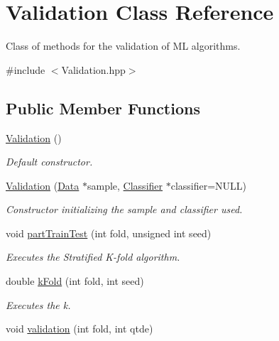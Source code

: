 \hypertarget{class_validation}{}\section{Validation Class Reference}
\label{class_validation}


Class of methods for the validation of ML algorithms.  




{\ttfamily \#include $<$Validation.\+hpp$>$}

\subsection*{Public Member Functions}
\begin{DoxyCompactItemize}
\item 
\mbox{\label{class_validation_ada040c6d31004cc277e2b74290eec266}} 
\hyperlink{class_validation_ada040c6d31004cc277e2b74290eec266}{Validation} ()
\begin{DoxyCompactList}\small\item\em Default constructor. \end{DoxyCompactList}\item 
\hyperlink{class_validation_a54a1ace2df11df3937c96cddd8b46f93}{Validation} (\hyperlink{class_data}{Data} $\ast$sample, \hyperlink{class_classifier}{Classifier} $\ast$classifier=N\+U\+LL)
\begin{DoxyCompactList}\small\item\em Constructor initializing the sample and classifier used. \end{DoxyCompactList}\item 
void \hyperlink{class_validation_a83b3cc552927fe8595f3cdd143d645c0}{part\+Train\+Test} (int fold, unsigned int seed)
\begin{DoxyCompactList}\small\item\em Executes the Stratified K-\/fold algorithm. \end{DoxyCompactList}\item 
double \hyperlink{class_validation_a3aae72caef37b12a57aaf5cdd862de3a}{k\+Fold} (int fold, int seed)
\begin{DoxyCompactList}\small\item\em Executes the k. \end{DoxyCompactList}\item 
void \hyperlink{class_validation_a166305aa3f117b119da69d54778286a0}{validation} (int fold, int qtde)

\end{DoxyCompactItemize}

